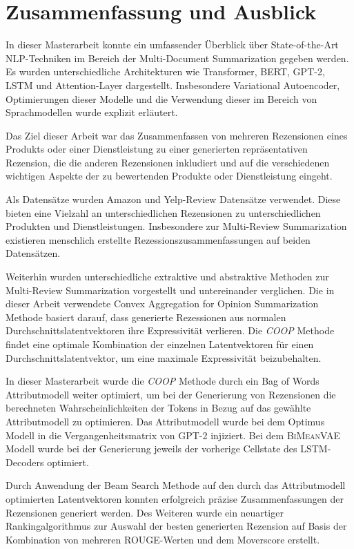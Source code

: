 \section{Zusammenfassung und Ausblick}\raggedbottom
In dieser Masterarbeit konnte ein umfassender Überblick über State-of-the-Art NLP-Techniken im Bereich der Multi-Document Summarization gegeben werden.
Es wurden unterschiedliche Architekturen wie Transformer, BERT, GPT-2, LSTM und Attention-Layer dargestellt. 
Insbesondere Variational Autoencoder, Optimierungen dieser Modelle und die Verwendung dieser im Bereich von Sprachmodellen wurde explizit erläutert.

Das Ziel dieser Arbeit war das Zusammenfassen von mehreren Rezensionen eines Produkts oder einer Dienstleistung zu einer generierten repräsentativen Rezension, die die anderen Rezensionen inkludiert und auf die verschiedenen wichtigen Aspekte der zu bewertenden Produkte oder Dienstleistung eingeht.

Als Datensätze wurden Amazon und Yelp-Review Datensätze verwendet. Diese bieten eine Vielzahl an unterschiedlichen Rezensionen zu unterschiedlichen Produkten und Dienstleistungen. Insbesondere zur Multi-Review Summarization existieren menschlich erstellte Rezessionszusammenfassungen auf beiden Datensätzen.

Weiterhin wurden unterschiedliche extraktive und abstraktive Methoden zur Multi-Review Summarization vorgestellt und untereinander verglichen. 
Die in dieser Arbeit verwendete Convex Aggregation for Opinion Summarization Methode basiert darauf, dass generierte Rezessionen aus normalen Durchschnittslatentvektoren ihre Expressivität verlieren. 
Die \textit{COOP} Methode findet eine optimale Kombination der einzelnen Latentvektoren für einen Durchschnittslatentvektor, um eine maximale Expressivität beizubehalten.

In dieser Masterarbeit wurde die \textit{COOP} Methode durch ein Bag of Words Attributmodell weiter optimiert, um bei der Generierung von Rezensionen die berechneten Wahrscheinlichkeiten der Tokens in Bezug auf das gewählte Attributmodell zu optimieren.
Das Attributmodell wurde bei dem Optimus Modell in die Vergangenheitsmatrix von GPT-2 injiziert. Bei dem \textsc{BiMeanVAE} Modell wurde bei der Generierung jeweils der vorherige Cellstate des LSTM-Decoders optimiert.

Durch Anwendung der Beam Search Methode auf den durch das Attributmodell optimierten Latentvektoren konnten erfolgreich präzise Zusammenfassungen der Rezensionen generiert werden.
Des Weiteren wurde ein neuartiger Rankingalgorithmus zur Auswahl der besten generierten Rezension auf Basis der Kombination von mehreren ROUGE-Werten und dem Moverscore erstellt.

